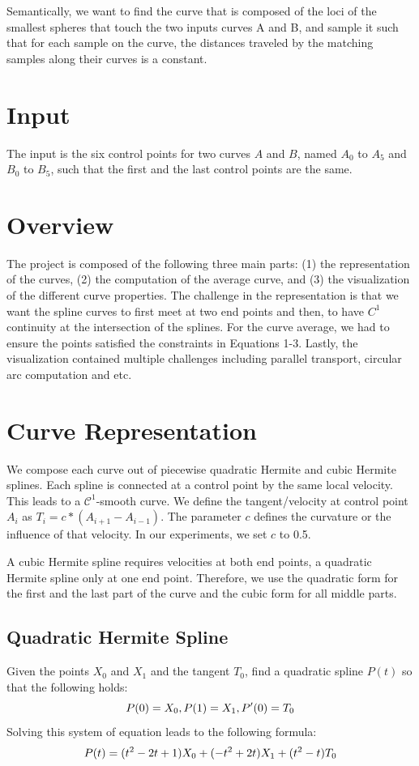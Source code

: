 \documentclass[journal, letterpaper]{IEEEtran}
\begin{document}
Semantically, we want to find the curve that is composed of the loci of the smallest spheres that touch the two inputs curves A and B,
and sample it such that for each sample on the curve, the distances traveled by the matching samples along their curves is a constant.

\section{Input}
The input is the six control points for two curves $A$ and $B$, named $A_0$ to $A_5$ and $B_0$ to $B_5$, such that the first and the last control points are the same.

\section{Overview}
The project is composed of the following three main parts: (1) the representation of the curves,
(2) the computation of the average curve, and (3) the visualization of the different curve properties.
The challenge in the representation is that we want the spline curves to first meet at two end points and then,
to have $C^1$ continuity at the intersection of the splines. For the curve average, we had to ensure
the points satisfied the constraints in Equations 1-3. Lastly, the visualization contained multiple challenges
including parallel transport, circular arc computation and etc.

\section{Curve Representation}
We compose each curve out of piecewise quadratic Hermite and cubic Hermite splines. Each spline is connected at a control point by the same local velocity. This leads to a $\mathcal{C}^1$-smooth curve.
We define the tangent/velocity at control point $A_i$ as $T_i = c*(A_{i+1}-A_{i-1})$. The parameter $c$ defines the curvature or the influence of that velocity. In our experiments, we set $c$ to 0.5.

A cubic Hermite spline requires velocities at both end points, a quadratic Hermite spline only at one end point. Therefore, we use the quadratic form for the first and the last part of the curve and the cubic form for all middle parts.

\subsection{Quadratic Hermite Spline}
Given the points $X_0$ and $X_1$ and the tangent $T_0$, find a quadratic spline $P(t)$ so that the following holds:
\begin{equation}
\small
 P(0)=X_0, P(1)=X_1, P'(0)=T_0
\end{equation}
Solving this system of equation leads to the following formula:
\begin{equation}
\small
 P(t) = (t^2-2t+1)X_0 + (-t^2+2t)X_1 + (t^2-t)T_0
\label{eq:QuadraticHermite}
\end{equation}
\end{document}
